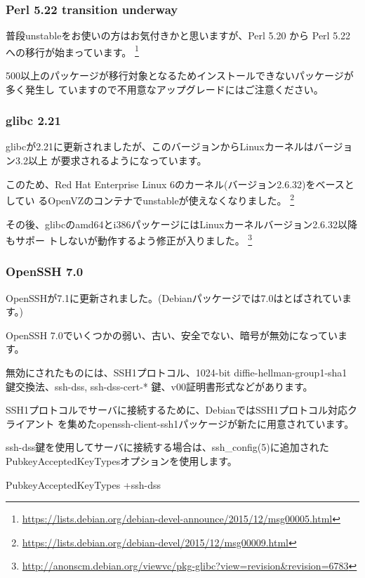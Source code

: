 \documentclass[mingoth,a4paper]{jsarticle}
\begin{document}
\subsubsection{Perl 5.22 transition underway}

普段unstableをお使いの方はお気付きかと思いますが、Perl 5.20 から Perl 5.22
への移行が始まっています。
\footnote{\url{https://lists.debian.org/debian-devel-announce/2015/12/msg00005.html}}

500以上のパッケージが移行対象となるためインストールできないパッケージが多く発生し
ていますので不用意なアップグレードにはご注意ください。


\subsubsection{glibc 2.21}

glibcが2.21に更新されましたが、このバージョンからLinuxカーネルはバージョン3.2以上
が要求されるようになっています。

このため、Red Hat Enterprise Linux 6のカーネル(バージョン2.6.32)をベースとしてい
るOpenVZのコンテナでunstableが使えなくなりました。
\footnote{\url{https://lists.debian.org/debian-devel/2015/12/msg00009.html}}

その後、glibcのamd64とi386パッケージにはLinuxカーネルバージョン2.6.32以降もサポー
トしないが動作するよう修正が入りました。
\footnote{\url{http://anonscm.debian.org/viewvc/pkg-glibc?view=revision&revision=6783}}


\subsubsection{OpenSSH 7.0}

OpenSSHが7.1に更新されました。(Debianパッケージでは7.0はとばされています。)

OpenSSH 7.0でいくつかの弱い、古い、安全でない、暗号が無効になっています。

無効にされたものには、SSH1プロトコル、1024-bit diffie-hellman-group1-sha1
鍵交換法、ssh-dss, ssh-dss-cert-* 鍵、v00証明書形式などがあります。

SSH1プロトコルでサーバに接続するために、DebianではSSH1プロトコル対応クライアント
を集めたopenssh-client-ssh1パッケージが新たに用意されています。

ssh-dss鍵を使用してサーバに接続する場合は、ssh\_config(5)に追加された
PubkeyAcceptedKeyTypesオプションを使用します。

\begin{commandline}
  PubkeyAcceptedKeyTypes +ssh-dss
\end{commandline}
\end{document}
